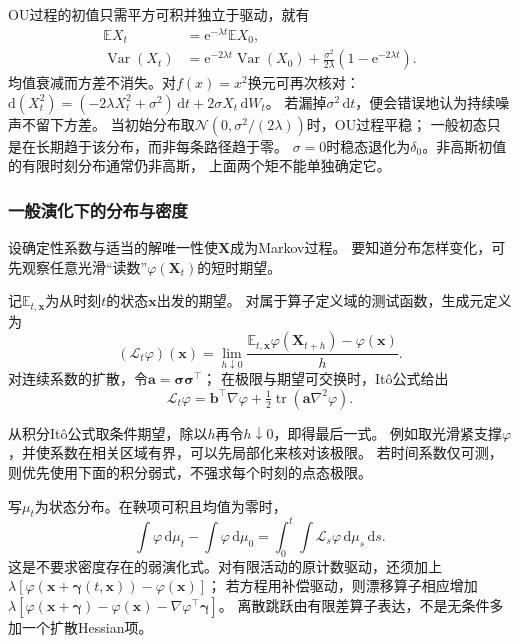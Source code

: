 OU过程的初值只需平方可积并独立于驱动，就有
\begin{align}
 \mathbb E X_t&=\mathrm e^{-\lambda t}\mathbb E X_0,
       \label{eq:dynamical-ou-mean}\\
 \operatorname{Var}(X_t)&=\mathrm e^{-2\lambda t}\operatorname{Var}(X_0)
       +\frac{\sigma^2}{2\lambda}(1-\mathrm e^{-2\lambda t}).
       \label{eq:dynamical-ou-variance}
\end{align}
均值衰减而方差不消失。对$f(x)=x^2$换元可再次核对：
$\mathrm d(X_t^2)=(-2\lambda X_t^2+\sigma^2)\,\mathrm dt
                 +2\sigma X_t\,\mathrm dW_t$。
若漏掉$\sigma^2\,\mathrm dt$，便会错误地认为持续噪声不留下方差。
当初始分布取$\mathcal N(0,\sigma^2/(2\lambda))$时，OU过程平稳；
一般初态只是在长期趋于该分布，而非每条路径趋于零。
$\sigma=0$时稳态退化为$\delta_0$。非高斯初值的有限时刻分布通常仍非高斯，
上面两个矩不能单独确定它。

\subsubsection{一般演化下的分布与密度}

设确定性系数与适当的解唯一性使$\bm X$成为Markov过程。
要知道分布怎样变化，可先观察任意光滑“读数”$\varphi(\bm X_t)$的短时期望。
\begin{definition}[Itô扩散的生成元]
 \label{def:dynamical-diffusion-generator}
 记$\mathbb E_{t,\bm x}$为从时刻$t$的状态$\bm x$出发的期望。
 对属于算子定义域的测试函数，生成元定义为
 \[
  (\mathcal L_t\varphi)(\bm x)
    =\lim_{h\downarrow0}
       \frac{\mathbb E_{t,\bm x}\varphi(\bm X_{t+h})-\varphi(\bm x)}h.
 \]
 对连续系数的扩散，令$\bm a=\bm\sigma\bm\sigma^\top$；
 在极限与期望可交换时，Itô公式给出
 \[
  \mathcal L_t\varphi=\bm b^\top\nabla\varphi+
                      \tfrac12\operatorname{tr}(\bm a\nabla^2\varphi).
 \]
\end{definition}
从积分Itô公式取条件期望，除以$h$再令$h\downarrow0$，即得最后一式。
例如取光滑紧支撑$\varphi$，并使系数在相关区域有界，可以先局部化来核对该极限。
若时间系数仅可测，则优先使用下面的积分弱式，不强求每个时刻的点态极限。

写$\mu_t$为状态分布。在鞅项可积且均值为零时，
\[
 \int\varphi\,\mathrm d\mu_t-\int\varphi\,\mathrm d\mu_0
     =\int_0^t\int\mathcal L_s\varphi\,\mathrm d\mu_s\,\mathrm ds.
\]
这是不要求密度存在的弱演化式。对有限活动的原计数驱动，还须加上
$\lambda[\varphi(\bm x+\bm\gamma(t,\bm x))-\varphi(\bm x)]$；
若方程用补偿驱动，则漂移算子相应增加
$\lambda[\varphi(\bm x+\bm\gamma)-\varphi(\bm x)
                          -\nabla\varphi^\top\bm\gamma]$。
离散跳跃由有限差算子表达，不是无条件多加一个扩散Hessian项。

